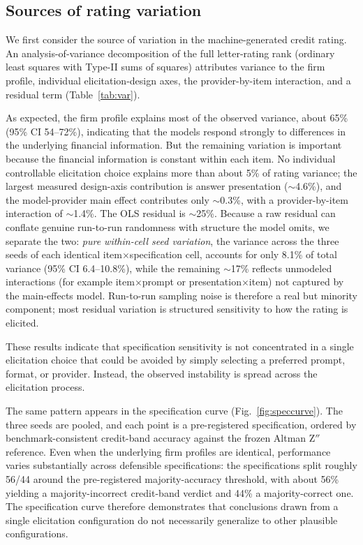 \documentclass[a4paper,fleqn]{cas-sc}
\begin{document}
\subsection{Sources of rating variation}
We first consider the source of variation in the machine-generated credit rating. An
analysis-of-variance decomposition of the full letter-rating rank (ordinary least squares with Type-II
sums of squares) attributes variance to the firm profile, individual elicitation-design axes, the
provider-by-item interaction, and a residual term (Table~\ref{tab:var}).

As expected, the firm profile explains most of the observed variance, about 65\% (95\% CI 54--72\%),
indicating that the models respond strongly to differences in the underlying financial information. But
the remaining variation is important because the financial information is constant within each item. No
individual controllable elicitation choice explains more than about 5\% of rating variance; the largest
measured design-axis contribution is answer presentation ($\sim$4.6\%), and the model-provider main
effect contributes only $\sim$0.3\%, with a provider-by-item interaction of $\sim$1.4\%. The OLS residual
is $\sim$25\%. Because a raw residual can conflate genuine run-to-run randomness with structure the model
omits, we separate the two: \emph{pure within-cell seed variation}, the variance across the three seeds
of each identical item$\times$specification cell, accounts for only 8.1\% of total variance (95\% CI
6.4--10.8\%), while the remaining $\sim$17\% reflects unmodeled interactions (for example
item$\times$prompt or presentation$\times$item) not captured by the main-effects model. Run-to-run
sampling noise is therefore a real but minority component; most residual variation is structured
sensitivity to how the rating is elicited.

These results indicate that specification sensitivity is not concentrated in a single elicitation choice
that could be avoided by simply selecting a preferred prompt, format, or provider. Instead, the observed
instability is spread across the elicitation process.

The same pattern appears in the specification curve (Fig.~\ref{fig:speccurve}). The three seeds are
pooled, and each point is a pre-registered specification, ordered by benchmark-consistent credit-band
accuracy against the frozen Altman Z$''$ reference. Even when the underlying firm profiles are identical,
performance varies substantially across defensible specifications: the specifications split roughly
56/44 around the pre-registered majority-accuracy threshold, with about 56\% yielding a
majority-incorrect credit-band verdict and 44\% a majority-correct one. The
specification curve therefore demonstrates that conclusions drawn from a single elicitation configuration
do not necessarily generalize to other plausible configurations.
\end{document}
